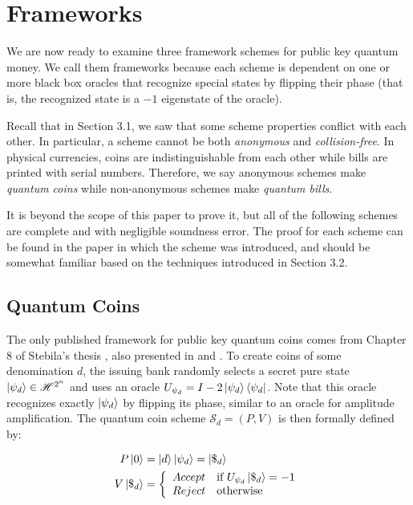 \documentclass[12pt]{article}
\begin{document}
\section{Frameworks}
We are now ready to examine three framework schemes for public key quantum money.  We call them frameworks because each scheme is dependent on one or more black box oracles that recognize special states by flipping their phase (that is, the recognized state is a $-1$ eigenstate of the oracle).

Recall that in Section 3.1, we saw that some scheme properties conflict with each other.  In particular, a scheme cannot be both \emph{anonymous} and \emph{collision-free}.  In physical currencies, coins are indistinguishable from each other while bills are printed with serial numbers.   Therefore, we say anonymous schemes make \emph{quantum coins} while non-anonymous schemes make \emph{quantum bills}.

It is beyond the scope of this paper to prove it, but all of the following schemes are complete and with negligible soundness error.  The proof for each scheme can be found in the paper in which the scheme was introduced, and should be somewhat familiar based on the techniques introduced in Section 3.2.

\subsection{Quantum Coins}
The only published framework for public key quantum coins comes from Chapter 8 of Stebila's thesis \cite{Ste09}, also presented in \cite{Mos06} and \cite{Mos10}.  To create coins of some denomination $d$, the issuing bank randomly selects a secret pure state $\Ket{\psi_d} \in \mathscr{H}^{2^n}$ and uses an oracle $U_{\psi_d} = I - 2\Ket{\psi_d}\Bra{\psi_d}$.  Note that this oracle recognizes exactly $\Ket{\psi_d}$ by flipping its phase, similar to an oracle for amplitude amplification.  The quantum coin scheme $\mathscr{S}_d = (P,V)$ is then formally defined by:

\begin{align*}
P\Ket{0} & = \Ket{d}\Ket{\psi_d} = \Ket{\$_d}\\
V\Ket{\$_d} & = \left\{
	\begin{array}{l l}
	Accept & \text{if $U_{\psi_d}\Ket{\$_d} = -1$}\\
	Reject & \text{otherwise}
	\end{array}
\right.
\end{align*}
\end{document}
